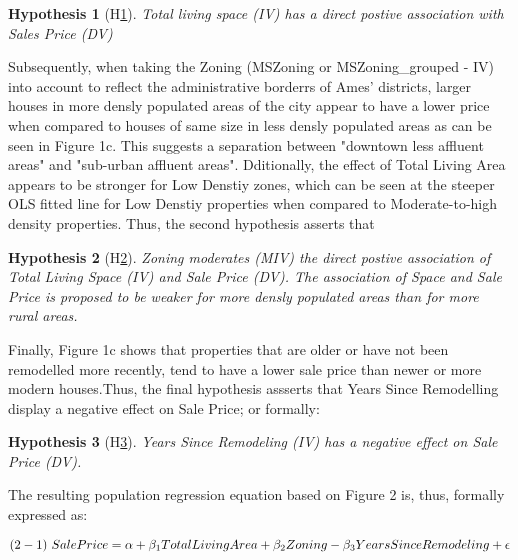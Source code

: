 \documentclass[a4paper]{article}
\newtheorem{hyp}{Hypothesis}
\begin{document}
\begin{hyp}[H\ref{hyp:first}] \label{hyp:first}
Total living space (IV) has a direct postive association with Sales Price (DV)
\end{hyp}


\indent Subsequently, when taking the Zoning (MSZoning or MSZoning\_grouped - IV) into account to reflect the administrative borderrs of Ames' districts, larger houses in more densly populated areas of the city appear to have a lower price when compared to houses of same size in less densly populated areas as can be seen in Figure 1c. This suggests a separation between "downtown less affluent areas" and "sub-urban affluent areas". Dditionally, the effect of Total Living Area appears to be stronger for Low Denstiy zones, which can be seen at the steeper OLS fitted line for Low Denstiy properties when compared to Moderate-to-high density properties. Thus, the second hypothesis asserts that

\begin{hyp}[H\ref{hyp:second}] \label{hyp:second}
Zoning moderates (MIV) the direct postive association of Total Living Space (IV) and Sale Price (DV). The association of Space and Sale Price is proposed to be weaker for more densly populated areas than for more rural areas. 
\end{hyp}



\indent Finally, Figure 1c shows that properties that are older or have not been remodelled more recently, tend to have a lower sale price than newer or more modern houses.Thus, the final hypothesis assserts that Years Since Remodelling display a negative effect on Sale Price; or formally:



\begin{hyp}[H\ref{hyp:third}] \label{hyp:third}
Years Since Remodeling (IV) has a negative effect on Sale Price (DV).
\end{hyp}

The resulting population regression equation based on Figure 2 is, thus, formally expressed as:



$$ (2-1)   \\\   {SalePrice} = \alpha + \beta_{1} Total Living Area
 + \beta_{2}  Zoning - \beta_{3}  Years Since Remodeling +\epsilon$$
\end{document}
